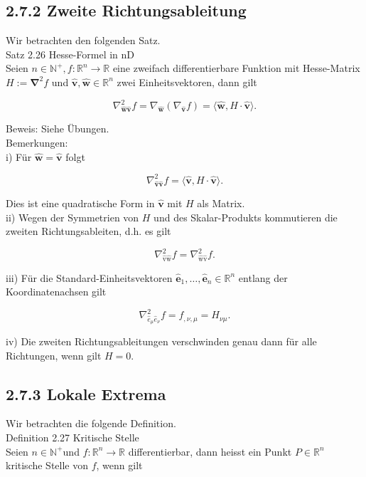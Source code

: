 \documentclass[10pt]{article}
\begin{document}
\subsection*{2.7.2 Zweite Richtungsableitung}
Wir betrachten den folgenden Satz.\\
Satz 2.26 Hesse-Formel in nD\\
Seien $n \in \mathbb{N}^{+}, f: \mathbb{R}^{n} \rightarrow \mathbb{R}$ eine zweifach differentierbare Funktion mit Hesse-Matrix $H:=\boldsymbol{\nabla}^{2} f$ und $\hat{\mathbf{v}}, \hat{\mathbf{w}} \in \mathbb{R}^{n}$ zwei Einheitsvektoren, dann gilt


\begin{equation*}
\nabla_{\hat{\mathbf{w}} \hat{\mathbf{v}}}^{2} f=\nabla_{\hat{\mathbf{w}}}\left(\nabla_{\hat{\mathbf{v}}} f\right)=\langle\hat{\mathbf{w}}, H \cdot \hat{\mathbf{v}}\rangle . \tag{2.200}
\end{equation*}


Beweis: Siehe Übungen.\\
Bemerkungen:\\
i) Für $\hat{\mathbf{w}}=\hat{\mathbf{v}}$ folgt


\begin{equation*}
\nabla_{\hat{\mathbf{v}} \hat{\mathbf{v}}}^{2} f=\langle\hat{\mathbf{v}}, H \cdot \hat{\mathbf{v}}\rangle . \tag{2.201}
\end{equation*}


Dies ist eine quadratische Form in $\hat{\mathbf{v}}$ mit $H$ als Matrix.\\
ii) Wegen der Symmetrien von $H$ und des Skalar-Produkts kommutieren die zweiten Richtungsableiten, d.h. es gilt


\begin{equation*}
\nabla_{\hat{\mathrm{v}} \hat{\mathrm{w}}}^{2} f=\nabla_{\hat{\mathrm{w}} \hat{\mathrm{v}}}^{2} f . \tag{2.202}
\end{equation*}


iii) Für die Standard-Einheitsvektoren $\hat{\mathbf{e}}_{1}, \ldots, \hat{\mathbf{e}}_{n} \in \mathbb{R}^{n}$ entlang der Koordinatenachsen gilt


\begin{equation*}
\nabla_{\hat{e}_{\mu} \hat{e}_{\nu}}^{2} f=f_{, \nu, \mu}=H_{\nu \mu} . \tag{2.203}
\end{equation*}


iv) Die zweiten Richtungsableitungen verschwinden genau dann für alle Richtungen, wenn gilt $H=0$.

\subsection*{2.7.3 Lokale Extrema}
Wir betrachten die folgende Definition.\\
Definition 2.27 Kritische Stelle\\
Seien $n \in \mathbb{N}^{+}$und $f: \mathbb{R}^{n} \rightarrow \mathbb{R}$ differentierbar, dann heisst ein Punkt $P \in \mathbb{R}^{n}$ kritische Stelle von $f$, wenn gilt
\end{document}
